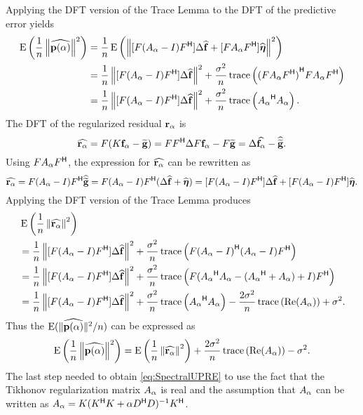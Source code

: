 Applying the DFT version of the Trace Lemma to the DFT of the predictive error yields
\begin{align*}
\operatorname{E}\left(\frac{1}{n}\left\|\widehat{\mathbf{p}(\alpha)}\right\|^2\right) &= \frac{1}{n}\operatorname{E}\left(\left\|[F(A_{\alpha} - I){F}^\mathsf{H}]\Delta\widehat{\mathbf{f}} + [FA_{\alpha}{{F}^\mathsf{H}}]\widehat{\boldsymbol{\eta}}\right\|^2\right) \\
&= \frac{1}{n}\left\|[F(A_{\alpha} - I){F}^\mathsf{H}]\Delta\widehat{\mathbf{f}}\right\|^2 + \frac{\sigma^2}{n}\operatorname{trace}\left({(FA_{\alpha}{{F}^\mathsf{H}})}^\mathsf{H}{FA_{\alpha}{{F}^\mathsf{H}}}\right) \\
&= \frac{1}{n}\left\|[F(A_{\alpha} - I){F}^\mathsf{H}]\Delta\widehat{\mathbf{f}}\right\|^2 + \frac{\sigma^2}{n}\operatorname{trace}\left({A_{\alpha}}^\mathsf{H}A_{\alpha}\right).
\end{align*}
The DFT of the regularized residual $\mathbf{r}_{\alpha}$ is
\[\widehat{\mathbf{r}_{\alpha}} = F(K\mathbf{f}_{\alpha} - \widetilde{\mathbf{g}}) = F{F}^\mathsf{H}\Delta{F}\mathbf{f}_{\alpha} - F\widetilde{\mathbf{g}} = \Delta\widehat{\mathbf{f}_{\alpha}} - \widehat{\widetilde{\mathbf{g}}}.\]
Using $F{A_{\alpha}}{F}^\mathsf{H}$, the expression for $\widehat{\mathbf{r}_{\alpha}}$ can be rewritten as
\[\widehat{\mathbf{r}_{\alpha}} = F(A_{\alpha} - I){{F}^\mathsf{H}}\widehat{\widetilde{\mathbf{g}}} = F(A_{\alpha} - I){{F}^\mathsf{H}}(\Delta\widehat{\mathbf{f}} + \widehat{\boldsymbol{\eta}}) = [F(A_{\alpha} - I){{F}^\mathsf{H}}]\Delta\widehat{\mathbf{f}} + [F(A_{\alpha} - I){{F}^\mathsf{H}}]\widehat{\boldsymbol{\eta}}.\]
Applying the DFT version of the Trace Lemma produces
\begin{align*}
&\operatorname{E}\left(\frac{1}{n}\left\|\widehat{\mathbf{r}_{\alpha}}\right\|^2\right) \\
&= \frac{1}{n}\left\|[F(A_{\alpha} - I){F}^\mathsf{H}]\Delta\widehat{\mathbf{f}}\right\|^2 + \frac{\sigma^2}{n}\operatorname{trace}\left(F{(A_{\alpha} - I)}^\mathsf{H}(A_{\alpha} - I){{F}^\mathsf{H}}\right) \\
&= \frac{1}{n}\left\|[F(A_{\alpha} - I){F}^\mathsf{H}]\Delta\widehat{\mathbf{f}}\right\|^2 + \frac{\sigma^2}{n}\operatorname{trace}\left(F({A_{\alpha}}^\mathsf{H}A_{\alpha} - ({A_{\alpha}}^\mathsf{H} + A_{\alpha}) + I){{F}^\mathsf{H}}\right) \\
&= \frac{1}{n}\left\|[F(A_{\alpha} - I){F}^\mathsf{H}]\Delta\widehat{\mathbf{f}}\right\|^2 + \frac{\sigma^2}{n}\operatorname{trace}\left({A_{\alpha}}^\mathsf{H}A_{\alpha}\right) - \frac{2\sigma^2}{n}\operatorname{trace}\left(\operatorname{Re}(A_{\alpha})\right) + \sigma^2.
\end{align*}
Thus the $\operatorname{E}(\|\widehat{\mathbf{p}(\alpha)}\|^2/n)$ can be expressed as
\[\operatorname{E}\left(\frac{1}{n}\left\|\widehat{\mathbf{p}(\alpha)}\right\|^2\right) = \operatorname{E}\left(\frac{1}{n}\left\|\widehat{\mathbf{r}_{\alpha}}\right\|^2\right) + \frac{2\sigma^2}{n}\operatorname{trace}\left(\operatorname{Re}(A_{\alpha})\right) - \sigma^2.\]
The last step needed to obtain \eqref{eq:SpectralUPRE} to use the fact that the Tikhonov regularization matrix $A_{\alpha}$ is real and the assumption that $A_{\alpha}$ can be written as $A_{\alpha} = K({K}^\mathsf{H}K + \alpha{{D}^\mathsf{H}}D)^{-1}{K}^\mathsf{H}$. \par
